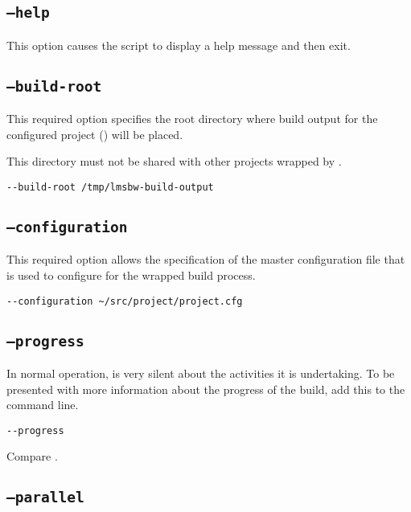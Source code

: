 \subsection{\texttt{--help}}

This option causes the script to display a help message and then exit.

\subsection{\texttt{--build-root}}

This required option specifies the root directory where build output
for the configured project () will be
placed.

This directory must not be shared with other projects wrapped by
\lmsbw.

\begin{verbatim}
--build-root /tmp/lmsbw-build-output
\end{verbatim}

\subsection{\texttt{--configuration}}\label{lmsbw:configuration}

This required option allows the specification of the master
configuration file that is used to configure \lmsbw for the wrapped
build process.

\begin{verbatim}
--configuration ~/src/project/project.cfg
\end{verbatim}


\subsection{\texttt{--progress}}\label{usinglmsbw:progress}

In normal operation, \lmsbw is very silent about the activities it is
undertaking.  To be presented with more information about the progress
of the build, add this to the command line.

\begin{verbatim}
--progress
\end{verbatim}

Compare .

\subsection{\texttt{--parallel}}

